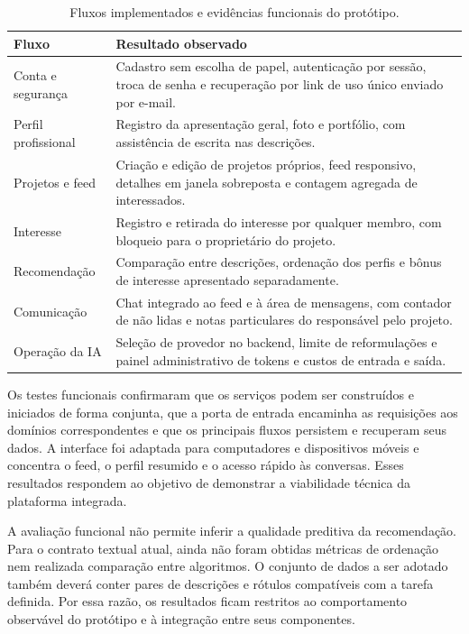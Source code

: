 \documentclass[12pt]{article}
\begin{document}
\begin{table}[ht]
\centering
\caption{Fluxos implementados e evidências funcionais do protótipo.}
\label{tab:resultados}
\begin{tabularx}{\textwidth}{p{}X}
\toprule
\textbf{Fluxo} & \textbf{Resultado observado} \\
\midrule
Conta e segurança & Cadastro sem escolha de papel, autenticação por sessão, troca de senha e recuperação por link de uso único enviado por e-mail. \\
Perfil profissional & Registro da apresentação geral, foto e portfólio, com assistência de escrita nas descrições. \\
Projetos e feed & Criação e edição de projetos próprios, feed responsivo, detalhes em janela sobreposta e contagem agregada de interessados. \\
Interesse & Registro e retirada do interesse por qualquer membro, com bloqueio para o proprietário do projeto. \\
Recomendação & Comparação entre descrições, ordenação dos perfis e bônus de interesse apresentado separadamente. \\
Comunicação & Chat integrado ao feed e à área de mensagens, com contador de não lidas e notas particulares do responsável pelo projeto. \\
Operação da IA & Seleção de provedor no backend, limite de reformulações e painel administrativo de tokens e custos de entrada e saída. \\
\bottomrule
\end{tabularx}
\end{table}

Os testes funcionais confirmaram que os serviços podem ser construídos e iniciados de forma conjunta, que a porta de entrada encaminha as requisições aos domínios correspondentes e que os principais fluxos persistem e recuperam seus dados. A interface foi adaptada para computadores e dispositivos móveis e concentra o feed, o perfil resumido e o acesso rápido às conversas. Esses resultados respondem ao objetivo de demonstrar a viabilidade técnica da plataforma integrada.

A avaliação funcional não permite inferir a qualidade preditiva da recomendação. Para o contrato textual atual, ainda não foram obtidas métricas de ordenação nem realizada comparação entre algoritmos. O conjunto de dados a ser adotado também deverá conter pares de descrições e rótulos compatíveis com a tarefa definida. Por essa razão, os resultados ficam restritos ao comportamento observável do protótipo e à integração entre seus componentes.
\end{document}
